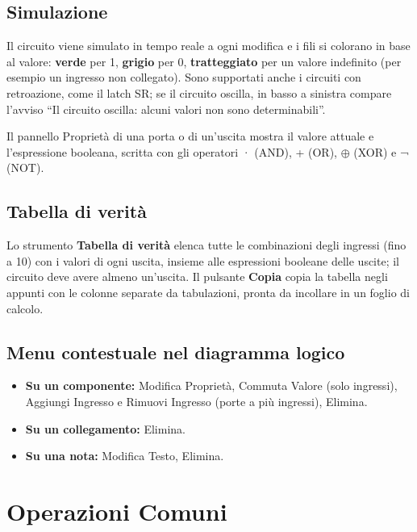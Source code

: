 \documentclass[a4paper,11pt]{article}
\newcommand{\uielement}[1]{\textbf{#1}}
\begin{document}
\subsection{Simulazione}

Il circuito viene simulato in tempo reale a ogni modifica e i fili si colorano in base al valore:
\textbf{verde} per 1, \textbf{grigio} per 0, \textbf{tratteggiato} per un valore indefinito (per
esempio un ingresso non collegato). Sono supportati anche i circuiti con retroazione, come il
latch SR; se il circuito oscilla, in basso a sinistra compare l'avviso ``Il circuito oscilla:
alcuni valori non sono determinabili''.

Il pannello Proprietà di una porta o di un'uscita mostra il valore attuale e l'espressione
booleana, scritta con gli operatori · (AND), + (OR), $\oplus$ (XOR) e ¬ (NOT).

\subsection{Tabella di verità}

Lo strumento \uielement{Tabella di verità} elenca tutte le combinazioni degli ingressi (fino a 10)
con i valori di ogni uscita, insieme alle espressioni booleane delle uscite; il circuito deve
avere almeno un'uscita. Il pulsante \uielement{Copia} copia la tabella negli appunti con le
colonne separate da tabulazioni, pronta da incollare in un foglio di calcolo.

\subsection{Menu contestuale nel diagramma logico}

\begin{itemize}
  \item \textbf{Su un componente:} Modifica Proprietà, Commuta Valore (solo ingressi), Aggiungi
        Ingresso e Rimuovi Ingresso (porte a più ingressi), Elimina.
  \item \textbf{Su un collegamento:} Elimina.
  \item \textbf{Su una nota:} Modifica Testo, Elimina.
\end{itemize}

\section{Operazioni Comuni}
\label{sec:comuni}
\end{document}
